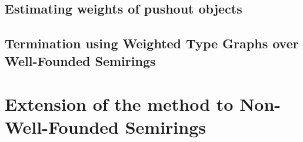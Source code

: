 \documentclass{report}
\begin{document}
%  
  
\subsection{Estimating weights of pushout objects} 
\label{sec:type_graph:weighing_pushout} 
  




\subsection{Termination using Weighted Type Graphs over Well-Founded Semirings}
\label{sec:type_graph:termination}
   
  
\section{Extension of the method to Non-Well-Founded Semirings}



% 
 
 
% 
\end{document}

